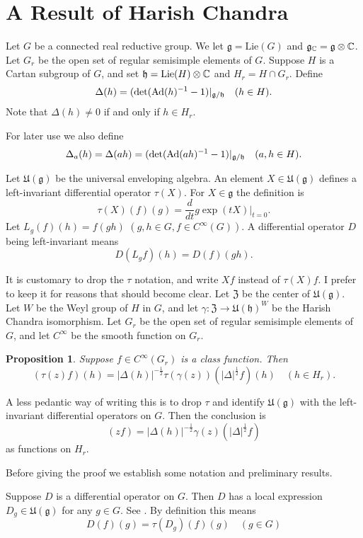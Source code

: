 \documentclass{article}
\newtheorem{pro}[thm]{Proposition}
\theoremstyle{definition}
\numberwithin{equation}{section}
\renewcommand{\-}{\hyp{}}
\newcommand{\inv}{^{-1}}
\newcommand{\z}{\mathfrak Z}
\newcommand{\U}{\mathfrak U}
\newcommand{\g}{\mathfrak g}
\newcommand{\h}{\mathfrak h}
\begin{document}
\section{A Result of Harish Chandra}

Let $G$ be
 a connected real reductive group.
We let $\g=\mathrm{Lie}(G)$ and $\g_\C=\g\otimes\C$.
Let $G_r$ be the open set of regular semisimple elements of $G$. Suppose $H$ is a  Cartan subgroup of $G$, and set $\h=\mathrm{Lie}(H)\otimes\C$ and 
$H_r=H\cap G_r$.
Define
$$
\Delta(h)=(\det(\Ad(h)\inv -1)|_{\g/\h}\quad (h\in H).
$$
Note that $\Delta(h)\ne 0$ if and only if $h\in H_r$.

For later use we also define
$$
\Delta_a(h)=\Delta(ah)=(\det(\Ad(ah)\inv -1)|_{\g/\h}\quad (a,h\in H).
$$


Let $\U(\g)$ be the universal enveloping algebra. 
An element $X\in \U(\g)$ defines a left-invariant differential operator $\tau(X)$.
For $X\in \g$ the definition is
$$\tau(X)(f)(g)=\frac d{dt}g\exp(tX)|_{t=0}.
$$
Let $L_g(f)(h)=f(gh)$ $(g,h\in G,f\in C^\infty(G))$. A differential operator $D$ being left-invariant means 
\begin{equation}
\label{e:left}
D(L_gf)(h)=D(f)(gh).
\end{equation}

It is customary to drop the $\tau$ notation, and write $Xf$ instead of $\tau(X)f$. I prefer to keep it for reasons that should become clear.
Let $\z$ be the center of  $\U(\g)$.
Let $W$ be the Weyl group of $H$ in $G$, and 
let $\gamma:\z\rightarrow \U(\h)^W$ be the Harish Chandra isomorphism.
Let $G_r$ be the open set of regular semisimple elements of $G$, and let $C^\infty$ be the smooth function on $G_r$. 


\begin{pro}
Suppose $f\in C^\infty(G_r)$ is a class function. Then
$$
(\tau(z)f)(h)=|\Delta(h)|^{-\frac12}\tau(\gamma(z))(|\Delta|^{\frac12}f)(h)\quad (h\in H_r).
$$
\end{pro}

A less pedantic way of writing this is to drop $\tau$ and identify $\U(\g)$ with the left-invariant differential operators on $G$. Then
the conclusion is
$$
(zf)=|\Delta(h)|^{-\frac12}\gamma(z)(|\Delta|^{\frac12}f)
$$
as functions on $H_r$.

Before giving the proof we establish some notation and preliminary results.



Suppose $D$ is a differential operator on $G$. Then $D$ has a local expression $D_g\in\U(\g)$ for any $g\in G$.
See \cite[Section 4]{HC_characters}.
By definition this means
\begin{equation}
  \label{e:tau}
  D(f)(g)=\tau(D_g)(f)(g)\quad(g\in G)
\end{equation}
\end{document}
